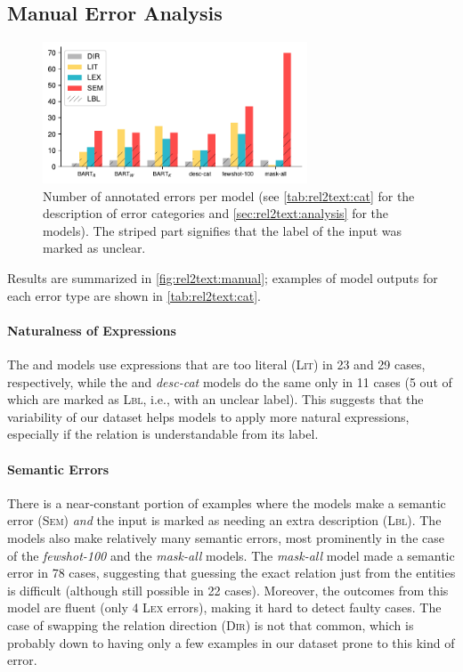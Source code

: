 \subsection{Manual Error Analysis}
\label{sec:rel2text:manual}

\begin{figure}[t]
    \centering
    \includegraphics[width=0.7\textwidth]{img/rel2text-graph.pdf}
    \caption[Manually annotated errors per model.]{Number of annotated errors per model (see \autoref{tab:rel2text:cat} for the description of error categories and \autoref{sec:rel2text:analysis} for the models). The striped part signifies that the label of the input was marked as unclear.}
    \label{fig:rel2text:manual}
\end{figure}
Results are summarized in \autoref{fig:rel2text:manual}; examples of model outputs for each error type are shown in \autoref{tab:rel2text:cat}.

\paragraph{Naturalness of Expressions} The \BARTk{} and \BARTw{} models use expressions that are too literal (\textsc{Lit}) in 23 and 29 cases, respectively, while the \BARTr{} and \textit{desc-cat} models do the same only in 11 cases (5 out of which are marked as \textsc{Lbl}, i.e., with an unclear label). This suggests that the variability of our dataset helps models to apply more natural expressions, especially if the relation is understandable from its label.

\paragraph{Semantic Errors} There is a near-constant portion of examples where the models make a semantic error (\textsc{Sem}) \textit{and} the input is marked as needing an extra description (\textsc{Lbl}). The models also make relatively many semantic errors, most prominently in the case of the \textit{fewshot-100} and the \textit{mask-all} models. The \textit{mask-all} model made a semantic error in 78 cases, suggesting that guessing the exact relation just from the entities is difficult (although still possible in 22 cases). Moreover, the outcomes from this model are fluent (only 4 \textsc{Lex} errors), making it hard to detect faulty cases.
The case of swapping the relation direction (\textsc{Dir}) is not that common, which is probably down to having only a few examples in our dataset prone to this kind of error.

